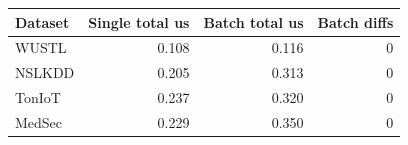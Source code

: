 \begin{tabular}{lrrr}
\toprule
Dataset & Single total us & Batch total us & Batch diffs \\
\midrule
WUSTL & 0.108 & 0.116 & 0 \\
NSLKDD & 0.205 & 0.313 & 0 \\
TonIoT & 0.237 & 0.320 & 0 \\
MedSec & 0.229 & 0.350 & 0 \\
\bottomrule
\end{tabular}
